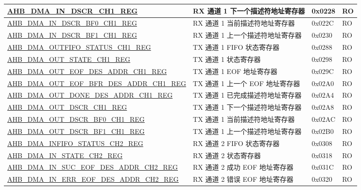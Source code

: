 \begin{longtable}{ | l | l | p{1.3cm} | l | }
\hyperref[regdesc:AHBDMAINDSCRCHNREG]{AHB\_DMA\_IN\_DSCR\_CH1\_REG} & RX 通道 1 下一个描述符地址寄存器 & 0x0228 & RO    \\ \hline
\hyperref[regdesc:AHBDMAINDSCRBF0CHNREG]{AHB\_DMA\_IN\_DSCR\_BF0\_CH1\_REG} & RX 通道 1 当前描述符地址寄存器 & 0x022C & RO    \\ \hline
\hyperref[regdesc:AHBDMAINDSCRBF1CHNREG]{AHB\_DMA\_IN\_DSCR\_BF1\_CH1\_REG} & RX 通道 1 上一个描述符地址寄存器 & 0x0230 & RO    \\ \hline
\hyperref[regdesc:AHBDMAOUTFIFOSTATUSCHNREG]{AHB\_DMA\_OUTFIFO\_STATUS\_CH1\_REG} & TX 通道 1 FIFO 状态寄存器 & 0x0288 & RO    \\ \hline
\hyperref[regdesc:AHBDMAOUTSTATECHNREG]{AHB\_DMA\_OUT\_STATE\_CH1\_REG} & TX 通道 1 状态寄存器 & 0x0298 & RO    \\ \hline
\hyperref[regdesc:AHBDMAOUTEOFDESADDRCHNREG]{AHB\_DMA\_OUT\_EOF\_DES\_ADDR\_CH1\_REG} & TX 通道 1 EOF 地址寄存器 & 0x029C & RO    \\ \hline
\hyperref[regdesc:AHBDMAOUTEOFBFRDESADDRCHNREG]{AHB\_DMA\_OUT\_EOF\_BFR\_DES\_ADDR\_CH1\_REG} & TX 通道 1 上一个 EOF 地址寄存器 & 0x02A0 & RO    \\ \hline
\hyperref[regdesc:AHBDMAOUTDONEDESADDRCHNREG]{AHB\_DMA\_OUT\_DONE\_DES\_ADDR\_CH1\_REG} & TX 通道 1 已完成描述符地址寄存器 & 0x02A4 & RO    \\ \hline
\hyperref[regdesc:AHBDMAOUTDSCRCHNREG]{AHB\_DMA\_OUT\_DSCR\_CH1\_REG} & TX 通道 1 下一个描述符地址寄存器 & 0x02A8 & RO    \\ \hline
\hyperref[regdesc:AHBDMAOUTDSCRBF0CHNREG]{AHB\_DMA\_OUT\_DSCR\_BF0\_CH1\_REG} & TX 通道 1 当前描述符地址寄存器 & 0x02AC & RO    \\ \hline
\hyperref[regdesc:AHBDMAOUTDSCRBF1CHNREG]{AHB\_DMA\_OUT\_DSCR\_BF1\_CH1\_REG} & TX 通道 1 上一个描述符地址寄存器 & 0x02B0 & RO    \\ \hline
\hyperref[regdesc:AHBDMAINFIFOSTATUSCHNREG]{AHB\_DMA\_INFIFO\_STATUS\_CH2\_REG} & RX 通道 2 FIFO 状态寄存器 & 0x0308 & RO    \\ \hline
\hyperref[regdesc:AHBDMAINSTATECHNREG]{AHB\_DMA\_IN\_STATE\_CH2\_REG} & RX 通道 2 状态寄存器 & 0x0318 & RO    \\ \hline
\hyperref[regdesc:AHBDMAINSUCEOFDESADDRCHNREG]{AHB\_DMA\_IN\_SUC\_EOF\_DES\_ADDR\_CH2\_REG} & RX 通道 2 成功 EOF 地址寄存器 & 0x031C & RO    \\ \hline
\hyperref[regdesc:AHBDMAINERREOFDESADDRCHNREG]{AHB\_DMA\_IN\_ERR\_EOF\_DES\_ADDR\_CH2\_REG} & RX 通道 2 错误 EOF 地址寄存器 & 0x0320 & RO    \\ \hline

\end{longtable}
